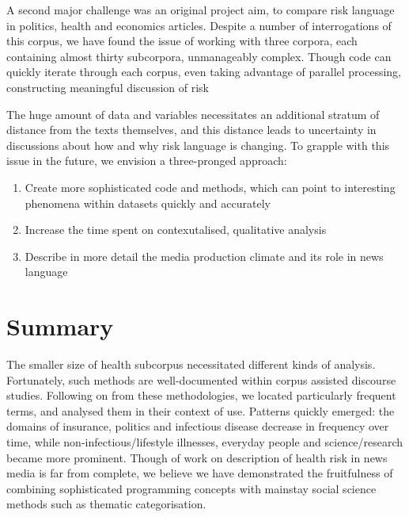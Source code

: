 A second major challenge was an original project aim, to compare risk language in politics, health and economics articles. Despite a number of interrogations of this corpus, we have found the issue of working with three corpora, each containing almost thirty subcorpora, unmanageably complex. Though code can quickly iterate through each corpus, even taking advantage of parallel processing, constructing meaningful discussion of risk 

The huge amount of data and variables necessitates an additional stratum of distance from the texts themselves, and this distance leads to uncertainty in discussions about how and why risk language is changing. To grapple with this issue in the future, we envision a three-pronged approach:

\begin{enumerate}
\item Create more sophisticated code and methods, which can point to interesting phenomena within datasets quickly and accurately
\item Increase the time spent on contexutalised, qualitative analysis
\item Describe in more detail the media production climate and its role in news language
\end{enumerate}

\section{Summary}

The smaller size of health subcorpus necessitated different kinds of analysis. Fortunately, such methods are well-documented within corpus assisted discourse studies. Following on from these methodologies, we located particularly frequent terms, and analysed them in their context of use. Patterns quickly emerged: the domains of insurance, politics and infectious disease decrease in frequency over time, while non-infectious\slash lifestyle illnesses, everyday people and science\slash research became more prominent. Though of work on description of health risk in news media is far from complete, we believe we have demonstrated the fruitfulness of combining sophisticated programming concepts with mainstay social science methods such as thematic categorisation.

